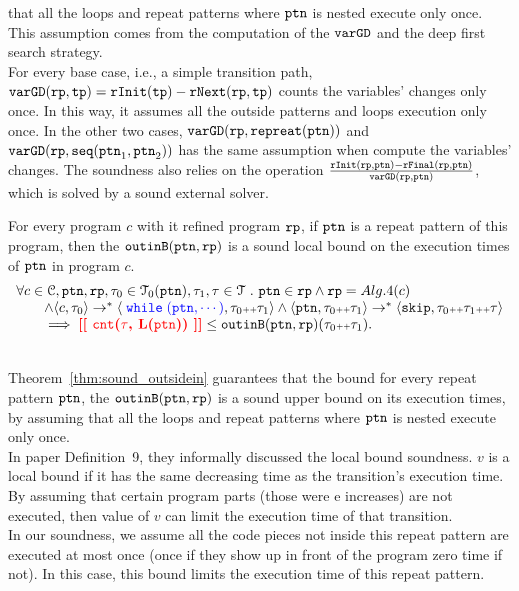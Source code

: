 that all the loops and repeat patterns where $\mathtt{ptn}$ is nested execute only once.
This assumption comes from the computation of the $\mathtt{varGD}$ and the deep first search strategy.
\\
For every base case, i.e., a simple transition path, 
$\mathtt{varGD}(\mathtt{rp}, \mathtt{tp}) =  \mathtt{rInit}(\mathtt{tp}) - \mathtt{rNext}(\mathtt{rp}, \mathtt{tp})$
counts the variables' changes only once. In this way, it assumes all the outside patterns and loops execution only once.
In the other two cases,  $\mathtt{varGD}(\mathtt{rp}, \mathtt{repreat}(\mathtt{ptn}))$ and $\mathtt{varGD}(\mathtt{rp}, \mathtt{seq}(\mathtt{ptn}_1, \mathtt{ptn}_2))$
has the same assumption when compute the variables' changes.
The soundness also relies on the operation $\frac{\mathtt{rInit}(\mathtt{rp}, \mathtt{ptn}) - \mathtt{rFinal}(\mathtt{rp}, \mathtt{ptn})}{\mathtt{varGD}(\mathtt{rp}, \mathtt{ptn})}$,
which is solved by a sound external solver. 
%
\begin{thm}
  \label{thm:sound_outsidein}
  For every program $c$ with it refined program $\mathtt{rp}$,
  if $\mathtt{ptn}$ is a repeat pattern of this program, then the $\mathtt{outinB}(\mathtt{ptn}, \mathtt{rp})$
is a sound local bound on the execution times of $\mathtt{ptn}$ in program $c$.
  \[
    \begin{array}{l}
    \forall c \in \cdom, \rpattern, \rprog, \trace_0 \in \mathcal{T}_0(\rpattern), \trace_1, \trace \in \mathcal{T} \st 
    \rpattern \in \rprog \land
    \rprog = Alg.4(c)
    \\ \qquad
    \land
    \config{c, \trace_0} \to^* \config{\highlight{\ewhile (\rpattern, \cdots)}, \trace_0 \tracecat \trace_1} 
    \land 
    \config{\rpattern, \trace_0 \tracecat \trace_1} \to^* \config{{\eskip, \trace_0 \tracecat \trace_1 \tracecat \trace}}
    \\ \qquad
    \implies
    \todo{\vcounter(\trace, L(\rpattern))} \leq \outinB(\rpattern, \rprog)(\trace_0 \tracecat \trace_1).
    \end{array}
    \]
\end{thm}
\\
Theorem~\ref{thm:sound_outsidein} guarantees that
the bound for every repeat pattern $\mathtt{ptn}$, the $\mathtt{outinB}(\mathtt{ptn}, \mathtt{rp})$
is a sound upper bound on its execution times, by assuming
that all the loops and repeat patterns where $\mathtt{ptn}$ is nested execute only once.
\\
In paper \cite{sinn2017complexity} Definition~9, they informally discussed the local bound soundness.
$v$ is a local bound if it has the same decreasing time as the transition's execution time.
By assuming that certain program parts (those were e increases) are not executed,
then value of $v$ can limit the execution time of that transition.
\\
In our soundness, we assume all the code pieces not inside this repeat pattern are executed at most once (once if they show up in front of the program
zero time if not).
In this case, this bound limits the execution time of this repeat pattern.
%
